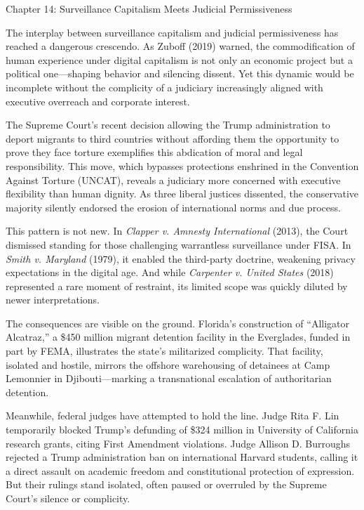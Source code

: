 Chapter 14: Surveillance Capitalism Meets Judicial Permissiveness

The interplay between surveillance capitalism and judicial
permissiveness has reached a dangerous crescendo. As Zuboff (2019)
warned, the commodification of human experience under digital capitalism
is not only an economic project but a political one---shaping behavior
and silencing dissent. Yet this dynamic would be incomplete without the
complicity of a judiciary increasingly aligned with executive overreach
and corporate interest.

The Supreme Court's recent decision allowing the Trump administration to
deport migrants to third countries without affording them the
opportunity to prove they face torture exemplifies this abdication of
moral and legal responsibility. This move, which bypasses protections
enshrined in the Convention Against Torture (UNCAT), reveals a judiciary
more concerned with executive flexibility than human dignity. As three
liberal justices dissented, the conservative majority silently endorsed
the erosion of international norms and due process.

This pattern is not new. In \emph{Clapper v. Amnesty International}
(2013), the Court dismissed standing for those challenging warrantless
surveillance under FISA. In \emph{Smith v. Maryland} (1979), it enabled
the third-party doctrine, weakening privacy expectations in the digital
age. And while \emph{Carpenter v. United States} (2018) represented a
rare moment of restraint, its limited scope was quickly diluted by newer
interpretations.

The consequences are visible on the ground. Florida's construction of
``Alligator Alcatraz,'' a \$450 million migrant detention facility in
the Everglades, funded in part by FEMA, illustrates the state's
militarized complicity. That facility, isolated and hostile, mirrors the
offshore warehousing of detainees at Camp Lemonnier in
Djibouti---marking a transnational escalation of authoritarian
detention.

Meanwhile, federal judges have attempted to hold the line. Judge Rita F.
Lin temporarily blocked Trump's defunding of \$324 million in University
of California research grants, citing First Amendment violations. Judge
Allison D. Burroughs rejected a Trump administration ban on
international Harvard students, calling it a direct assault on academic
freedom and constitutional protection of expression. But their rulings
stand isolated, often paused or overruled by the Supreme Court's silence
or complicity.

